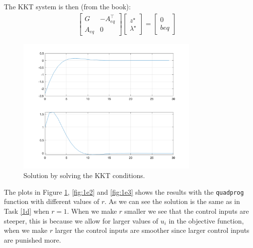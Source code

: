 \documentclass[11pt, a4paper, english]{NTNUoving}
\begin{document}
\begin{oppgave}
\begin{punkt}
        The KKT system is then (from the book):
        \begin{align*}
            \begin{bmatrix}
                G &  -A^\top_{eq} \\
                A_{eq} & 0
            \end{bmatrix} \begin{bmatrix}
                z^\star \\
                \lambda^\star
            \end{bmatrix} = \begin{bmatrix}
                0 \\
                beq
            \end{bmatrix}
        \end{align*}
        \begin{figure}[H]
            \centering
            \includegraphics[width=0.8\textwidth]{../1d.png}
            \caption{Solution by solving the KKT conditions.}
            \label{fig:1e1}
        \end{figure}


    \end{punkt}

    \begin{punkt}

        The plots in Figure \ref{fig:1e1}, \ref{fig:1e2} and \ref{fig:1e3} shows the results with the \texttt{quadprog} function with different
        values of $r$. As we can see the solution is the same as in Task \ref{1d} when $r=1$.
        When we make $r$ smaller we see that the control inputs are steeper, this is because we allow for larger values of $u_i$
        in the objective function, when we make $r$ larger the control inputs are smoother since larger control inputs are punished more.


\end{punkt}
\end{oppgave}
\end{document}
